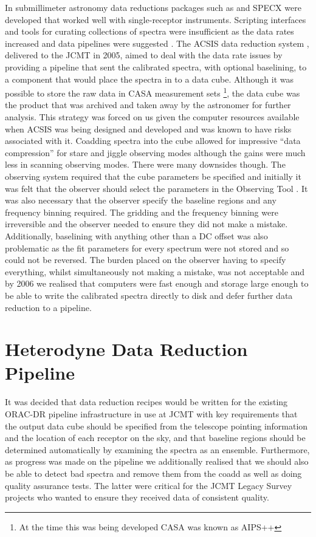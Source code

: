 \documentclass[final,authoryear,5p,times,twocolumn]{elsarticle}
\begin{document}
In submillimeter astronomy data reductions packages such as
 and
SPECX \citep{SPECX} were developed that worked well with
single-receptor instruments. Scripting interfaces and tools for
curating collections of spectra were insufficient as the data rates
increased and data pipelines were suggested
\citep[e.g.,][]{1995ASPC...75..117W}. The ACSIS data reduction system
\citep{2000ASPC..216..502L,2000SPIE.4015..114H}, delivered to the JCMT
in 2005, aimed to deal with the data rate issues by providing a
pipeline that sent the calibrated spectra, with optional baselining,
to a component that would place the spectra in to a data
cube. Although it was possible to store the raw data in CASA
measurement sets \citep{2012ASPC..461..849P}\footnote{At the time this
  was being developed CASA was known as AIPS++}, the data cube was the product that was archived and
taken away by the astronomer for further analysis. This strategy was
forced on us given the computer resources available when ACSIS was
being designed and developed and was known to have risks associated
with it. Coadding spectra into the cube allowed for impressive ``data
compression'' for stare and jiggle observing modes although the gains
were much less in scanning observing modes. There were many downsides
though. The observing system required that the cube parameters be
specified and initially it was felt that the observer should select
the parameters in the Observing Tool \citep{2002ASPC..281..453F}. It
was also necessary that the observer specify the baseline regions and
any frequency binning required. The gridding and the frequency binning
were irreversible and the observer needed to ensure they did not make
a mistake. Additionally, baselining with anything other than a DC
offset was also problematic as the fit parameters for every spectrum
were not stored and so could not be reversed. The burden placed on the
observer having to specify everything, whilst simultaneously not
making a mistake, was not acceptable and by 2006 we realised that
computers were fast enough and storage large enough to be able to
write the calibrated spectra directly to disk and defer further data
reduction to a pipeline.

\section{Heterodyne Data Reduction Pipeline}

It was decided that data reduction recipes would be written for the
existing ORAC-DR pipeline infrastructure in use at JCMT
\citep{TFAJenness2011,2008AN....329..295C} with key requirements that
the output data cube should be specified from the telescope pointing
information and the location of each receptor on the sky, and that
baseline regions should be determined automatically by examining the
spectra as an ensemble. Furthermore, as progress was made on the
pipeline we additionally realised that we should also be able to
detect bad spectra and remove them from the coadd as well as doing
quality assurance tests. The latter were critical for the JCMT Legacy
Survey projects
\citep{2007PASP..119..855W,2009ApJ...693.1736W,2007PASP..119..102P}
who wanted to ensure they received data of consistent quality.
\end{document}
